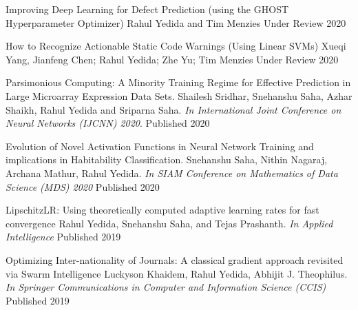 


\begin{cvhonors}

    \cvhonor
        {Improving Deep Learning for Defect Prediction (using the GHOST Hyperparameter Optimizer)}
        {Rahul Yedida and Tim Menzies}
        {Under Review}
        {2020}

    \cvhonor
        {How to Recognize Actionable Static Code Warnings (Using Linear SVMs)}
        {Xueqi Yang, Jianfeng Chen; Rahul Yedida; Zhe Yu; Tim Menzies}
        {Under Review}
        {2020}

    \cvhonor
        {Parsimonious Computing: A Minority Training Regime for Effective Prediction in Large Microarray Expression Data Sets.}
        {Shailesh Sridhar, Snehanshu Saha, Azhar Shaikh, Rahul Yedida and Sriparna Saha.  \textit{In International Joint Conference on Neural Networks (IJCNN) 2020}.}
        {Published}
        {2020}

    \cvhonor
        {Evolution of Novel Activation Functions in Neural Network Training and implications in Habitability Classification.}
        {Snehanshu Saha, Nithin Nagaraj, Archana Mathur, Rahul Yedida. \textit{In SIAM Conference on Mathematics of Data Science (MDS) 2020}}
        {Published}
        {2020}

  \cvhonor
    {LipschitzLR: Using theoretically computed adaptive learning rates for fast convergence}
    {Rahul Yedida, Snehanshu Saha, and Tejas Prashanth. \textit{In Applied Intelligence}}
    {Published} %
    {2019} %

  \cvhonor
    {Optimizing Inter-nationality of Journals: A classical gradient approach revisited via Swarm Intelligence}
    {Luckyson Khaidem, Rahul Yedida, Abhijit J. Theophilus. \textit{In Springer Communications in Computer and Information Science (CCIS)}}
    {Published} %
    {2019} %
    
\end{cvhonors}